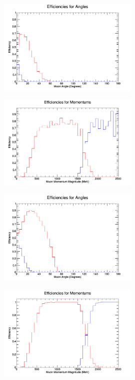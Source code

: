 \documentclass[11pt]{article}
\begin{document}
\begin{figure}[H]
\centering
\includegraphics[width=0.6\textwidth]{NMCombinedPlotsImages/3-NMCombinedPlots.png}
\caption{}
\end{figure}

\begin{figure}[H]
\centering
\includegraphics[width=0.6\textwidth]{NMCombinedPlotsImages/4-NMCombinedPlots.png}
\caption{}
\end{figure}

\begin{figure}[H]
\centering
\includegraphics[width=0.6\textwidth]{NMCombinedPlotsImages/5-NMCombinedPlots.png}
\caption{}
\end{figure}

\begin{figure}[H]
\centering
\includegraphics[width=0.6\textwidth]{NMCombinedPlotsImages/6-NMCombinedPlots.png}
\caption{}
\end{figure}
\end{document}
